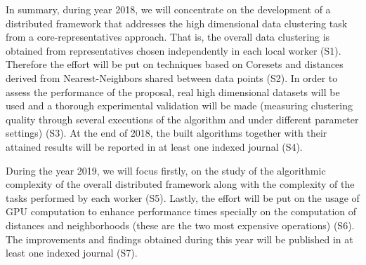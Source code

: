 \documentclass[10pt]{article}
\begin{document}
In summary, during year 2018, we will concentrate on the development of a distributed framework that addresses the high dimensional data clustering task from a core-representatives approach. That is, the overall data clustering is obtained from representatives chosen independently in each local worker (S1). Therefore the effort will be put on techniques based on Coresets and distances derived from Nearest-Neighbors shared between data points (S2).
In order to assess the performance of the proposal, real high dimensional datasets will be used and a thorough experimental validation will be made (measuring clustering quality through several executions of the algorithm and under different parameter settings) (S3).
At the end of 2018, the built algorithms together with their attained results will be reported in at least one indexed journal (S4).





During the year 2019, we will focus firstly, on the study of the algorithmic complexity of the overall distributed framework along with the complexity of the tasks performed by each worker (S5). 
Lastly, the effort will be put on the usage of GPU computation to enhance performance times specially on the computation of distances and neighborhoods (these are the two most expensive operations) (S6). 
The improvements and findings obtained during this year will be published in at least one indexed
journal (S7).
\end{document}
